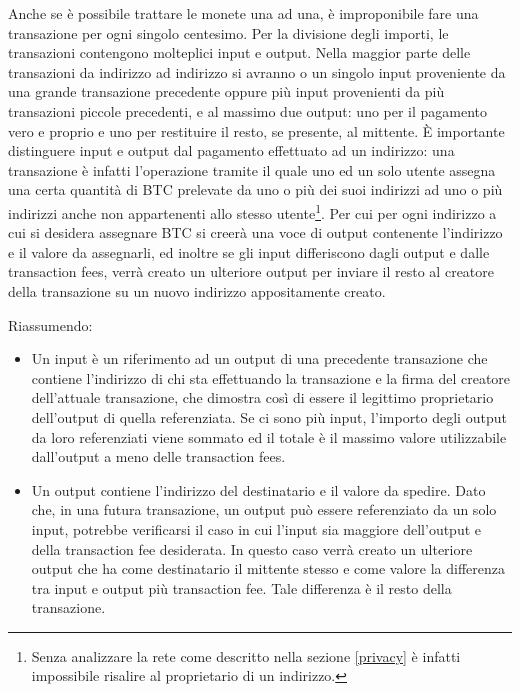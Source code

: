 Anche se è possibile trattare le monete una ad una, è improponibile fare una transazione per ogni singolo centesimo. Per la divisione degli importi, le transazioni contengono molteplici input e output. Nella maggior parte delle transazioni da indirizzo ad indirizzo si avranno o un singolo input proveniente da una grande transazione precedente oppure più input provenienti da più transazioni piccole precedenti, e al massimo due output: uno per il pagamento vero e proprio e uno per restituire il resto, se presente, al mittente. È importante distinguere input e output dal pagamento effettuato ad un indirizzo: una transazione è infatti l'operazione tramite il quale uno ed un solo utente assegna una certa quantità di BTC prelevate da uno o più dei suoi indirizzi ad uno o più indirizzi anche non appartenenti allo stesso utente\footnote{Senza analizzare la rete come descritto nella sezione \ref{privacy} è infatti impossibile risalire al proprietario di un indirizzo.}. Per cui per ogni indirizzo a cui si desidera assegnare BTC si creerà una voce di output contenente l'indirizzo e il valore da assegnarli, ed inoltre se gli input differiscono dagli output e dalle transaction fees, verrà creato un ulteriore output per inviare il resto al creatore della transazione su un nuovo indirizzo appositamente creato.

Riassumendo:

\begin{itemize}
\itemsep1pt\parskip0pt
\item
  Un input è un riferimento ad un output di una precedente transazione   che contiene l'indirizzo di chi sta effettuando la transazione e la firma del creatore dell'attuale transazione, che dimostra così di essere il legittimo proprietario dell'output di quella referenziata. Se ci   sono più input, l'importo degli output da loro referenziati viene   sommato ed il totale è il massimo valore utilizzabile dall'output a meno delle transaction fees.
\item
  Un output contiene l'indirizzo del destinatario e il valore da   spedire. Dato che, in una futura transazione, un output può essere referenziato da un solo input, potrebbe verificarsi il caso in cui l'input sia maggiore dell'output e della transaction fee desiderata. In questo caso verrà creato un ulteriore output che ha come destinatario il mittente stesso e come valore la differenza tra input e output più transaction fee. Tale differenza è il resto della transazione.
\end{itemize}

